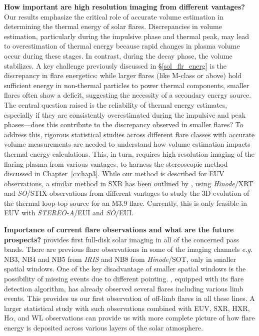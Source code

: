 \noindent
{\bf How important are high resolution imaging from different vantages?} Our results emphasize the critical role of accurate volume estimation in determining the thermal energy of solar flares. Discrepancies in volume estimation, particularly during the impulsive phase and thermal peak, may lead to overestimation of thermal energy because rapid changes in plasma volume occur during these stages. In contrast, during the decay phase, the volume stabilizes. A key challenge previously discussed in \S\ref{sol_flr_energ} is the discrepancy in flare energetics: while larger flares (like M-class or above) hold sufficient energy in non-thermal particles to power thermal components, smaller flares often show a deficit, suggesting the necessity of a secondary energy source. The central question raised is the reliability of thermal energy estimates, especially if they are consistently overestimated during the impulsive and peak phases—does this contribute to the discrepancy observed in smaller flares? To address this, rigorous statistical studies across different flare classes with accurate volume measurements are needed to understand how volume estimation impacts thermal energy calculations. This, in turn, requires high-resolution imaging of the flaring plasma from various vantages, to harness the stereoscopic method discussed in Chapter~\ref{c:chap3}. While our method is described for EUV observations, a similar method in SXR has been outlined by \cite{ryan24}, using \textit{Hinode}/XRT and \textit{SO}/STIX observations from different vantages to study the 3D evolution of the thermal loop-top source for an M3.9 flare. Currently, this is only feasible in EUV with \textit{STEREO-A}/EUI and \textit{SO}/EUI.


\noindent
{\bf Importance of current {\suit} flare observations and what are the future prospects?} {\suit} provides first full-disk solar imaging in all of the concerned pass bands. There are previous flare observations in some of the imaging channels {\it e.g.} NB3, NB4 and NB5 from {\it IRIS} and NB8 from {\it Hinode}/SOT, only in smaller spatial windows. One of the key disadvantage of smaller spatial windows is the possibility of missing events due to different pointing. {\suit}, equipped with its flare detection algorithm, has already observed several flares including various limb events. This provides us our first observation of off-limb flares in all these lines. A larger statistical study with such observations combined with EUV, SXR, HXR, H$\alpha$, and WL observations can provide us with more complete picture of how flare energy is deposited across various layers of the solar atmosphere.
